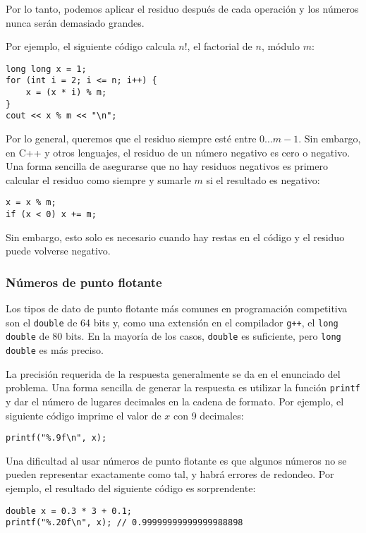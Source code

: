 Por lo tanto, podemos aplicar el residuo después de cada operación
y los números nunca serán demasiado grandes.

Por ejemplo, el siguiente código calcula $n!$,
el factorial de $n$, módulo $m$:
\begin{lstlisting}
long long x = 1;
for (int i = 2; i <= n; i++) {
    x = (x * i) % m;
}
cout << x % m << "\n";
\end{lstlisting}

Por lo general, queremos que el residuo siempre
esté entre $0\ldots m-1$.
Sin embargo, en C++ y otros lenguajes,
el residuo de un número negativo
es cero o negativo.
Una forma sencilla de asegurarse
que no hay residuos negativos es primero calcular
el residuo como siempre y sumarle $m$
si el resultado es negativo:
\begin{lstlisting}
x = x % m;
if (x < 0) x += m;
\end{lstlisting}
Sin embargo, esto solo es necesario cuando hay
restas en el código y
el residuo puede volverse negativo.

\subsubsection{Números de punto flotante}


Los tipos de dato de punto flotante más comunes en
programación competitiva son
el \texttt{double} de 64 bits
y, como una extensión en el compilador \texttt{g++},
el \texttt{long double} de 80 bits.
En la mayoría de los casos, \texttt{double} es suficiente,
pero \texttt{long double} es más preciso.

La precisión requerida de la respuesta 
generalmente se da en el enunciado del problema.
Una forma sencilla de generar la respuesta es utilizar
la función \texttt{printf}
y dar el número de lugares decimales
en la cadena de formato.
Por ejemplo, el siguiente código imprime
el valor de $x$ con 9 decimales:

\begin{lstlisting}
printf("%.9f\n", x);
\end{lstlisting}

Una dificultad al usar números de punto flotante
es que algunos números no se pueden representar
exactamente como tal,
y habrá errores de redondeo.
Por ejemplo, el resultado del siguiente código
es sorprendente:

\begin{lstlisting}
double x = 0.3 * 3 + 0.1;
printf("%.20f\n", x); // 0.99999999999999988898
\end{lstlisting}

